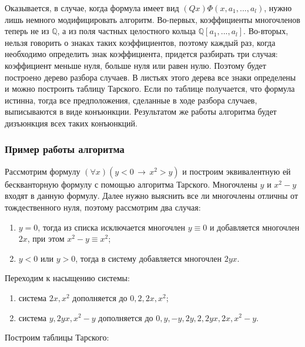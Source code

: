 Оказывается, в случае, когда формула имеет вид $(Qx)\Phi(x, a_1, ... , a_l)$, нужно лишь немного модифицировать алгоритм. Во-первых, коэффициенты многочленов теперь не из $\mathbb{Q}$, а из поля частных целостного кольца $\mathbb{Q}\left[a_1, ... , a_l\right]$. Во-вторых, нельзя говорить о знаках таких коэффициентов, поэтому каждый раз, когда необходимо определить знак коэффициента, придется разбирать три случая: коэффициент меньше нуля, больше нуля или равен нулю. Поэтому будет построено дерево разбора случаев. В листьях этого дерева все знаки определены и можно построить таблицу Тарского. Если по таблице получается, что формула истинна, тогда все предположения, сделанные в ходе разбора случаев, выписываются в виде конъюнкции. Результатом же работы алгоритма будет дизъюнкция всех таких конъюнкций.

\subsubsection{Пример работы алгоритма}
Рассмотрим формулу $(\forall x)(y < 0 \, \to \, x^2 > y)$ и построим эквивалентную ей бескванторную формулу с помощью алгоритма Тарского. Многочлены $y$ и $x^2 - y$ входят в данную формулу. Далее нужно выяснить все ли многочлены отличны от тождественного нуля, поэтому рассмотрим два случая:
\begin{enumerate}
    \item $y = 0$, тогда из списка исключается многочлен $y \equiv 0$ и добавляется многочлен $2x$, при этом $x^2 - y \equiv x^2$;
    \item $y < 0$ или $y > 0$, тогда в систему добавляется многочлен $2yx$.
\end{enumerate}
Переходим к насыщению системы:
\begin{enumerate}
    \item система $2x, x^2$ дополняется до $0, 2, 2x, x^2$;
    \item система $y, 2yx, x^2 - y$ дополняется до $0, y, -y, 2y, 2, 2yx, 2x, x^2 - y$.
\end{enumerate}
Построим таблицы Тарского:
